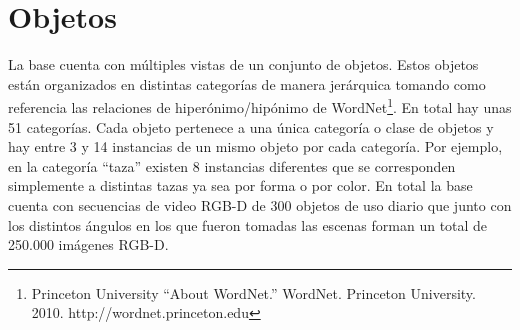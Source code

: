 \section{Objetos}
La base cuenta con múltiples vistas de un conjunto de objetos. Estos objetos están organizados en distintas categorías de manera jerárquica tomando como referencia las relaciones de hiperónimo/hipónimo de WordNet\footnote{Princeton University ``About WordNet.'' WordNet. Princeton University. 2010. http://wordnet.princeton.edu}. En total hay unas 51 categorías. Cada objeto pertenece a una única categoría o clase de objetos y hay entre 3 y 14 instancias de un mismo objeto por cada categoría. Por ejemplo, en la categoría ``taza'' existen 8 instancias diferentes que se corresponden simplemente a distintas tazas ya sea por forma o por color. En total la base cuenta con secuencias de video RGB-D de 300 objetos de uso diario que junto con los distintos ángulos en los que fueron tomadas las escenas forman un total de 250.000 imágenes RGB-D.


